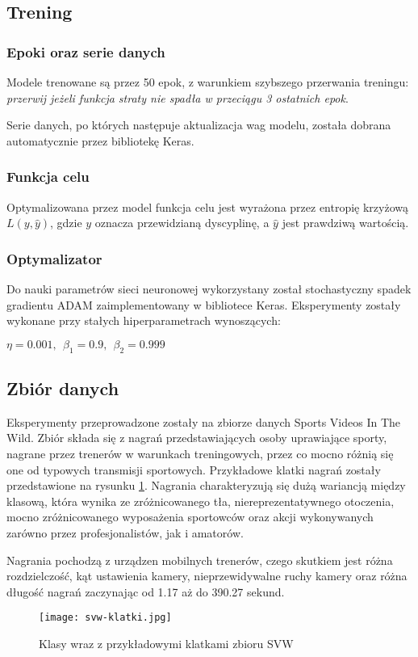 \subsection{Trening}
\subsubsection{Epoki oraz serie danych}
Modele trenowane są przez 50 epok, z warunkiem szybszego przerwania treningu: \textit{przerwij jeżeli funkcja straty nie spadła w przeciągu 3 ostatnich epok}. 

Serie danych, po których następuje aktualizacja wag modelu, została dobrana automatycznie przez bibliotekę Keras. 
\subsubsection{Funkcja celu}
Optymalizowana przez model funkcja celu jest wyrażona przez entropię krzyżową $L(y, \hat{y})$, gdzie $y$ oznacza przewidzianą dyscyplinę, a $\hat{y}$ jest prawdziwą wartością. 
\subsubsection{Optymalizator} 
Do nauki parametrów sieci neuronowej wykorzystany został stochastyczny spadek gradientu ADAM zaimplementowany w bibliotece Keras. Eksperymenty zostały wykonane przy stałych hiperparametrach wynoszących: 

$\eta=0.001, \ \ \beta_1=0.9,\ \  \beta_2=0.999$
\subsection{Zbiór danych}
Eksperymenty przeprowadzone zostały na zbiorze danych Sports Videos In The Wild. Zbiór składa się z nagrań
przedstawiających osoby uprawiające sporty, nagrane przez trenerów w warunkach treningowych, przez co mocno różnią się
one od typowych transmisji sportowych. Przykładowe klatki nagrań zostały przedstawione na rysunku \ref{fig:svw-klatki}.
Nagrania charakteryzują się dużą wariancją między klasową, która wynika ze zróżnicowanego tła, niereprezentatywnego
otoczenia, mocno zróżnicowanego wyposażenia sportowców oraz akcji wykonywanych zarówno przez profesjonalistów, jak i
amatorów.

Nagrania pochodzą z urządzen mobilnych trenerów, czego skutkiem jest różna rozdzielczość, kąt ustawienia
kamery, nieprzewidywalne ruchy kamery oraz różna długość nagrań zaczynając od 1.17 aż do 390.27 sekund.
\begin{figure}[!h]
    \centering \texttt{[image: svw-klatki.jpg]}
    \caption{Klasy wraz z przykładowymi klatkami zbioru SVW}
    \label{fig:svw-klatki}
\end{figure}
